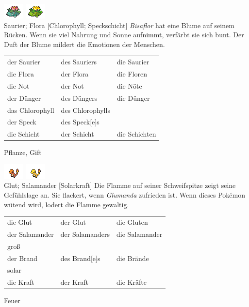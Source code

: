 \documentclass[a7paper,10pt,grid=both
,toc
]{kartei}
\begin{document}
\begin{karte}[Notdünger]{
\includegraphics{../regular/venusaur}
\includegraphics{../shiny/venusaur} \\
Saurier; Flora
}[Chlorophyll; Speckschicht]
\emph{Bisaflor} hat eine Blume auf seinem Rücken. Wenn sie viel Nahrung und
Sonne aufnimmt, verfärbt sie sich bunt. Der Duft der Blume mildert die Emotionen
der Menschen.

\vspace{5pt}
\begin{tabular}{lll}
der Saurier & des Sauriers & die Saurier \\
die Flora & der Flora & die Floren \\
die Not & der Not & die Nöte \\
der Dünger & des Düngers & die Dünger \\
das Chlorophyll & des Chlorophylls & \\
der Speck & des Speck[e]s & \\
die Schicht & der Schicht & die Schichten \\
\end{tabular}
\vspace{5pt}

Pflanze, Gift
\end{karte}


\begin{karte}[Großbrand]{
\includegraphics{../regular/charmander}
\includegraphics{../shiny/charmander} \\
Glut; Salamander
}[Solarkraft]
Die Flamme auf seiner Schweifspitze zeigt seine Gefühlslage an. Sie flackert,
wenn \emph{Glumanda} zufrieden ist. Wenn dieses Pokémon wütend wird, lodert die
Flamme gewaltig.

\vspace{5pt}
\begin{tabular}{lll}
die Glut	&	der Glut	&	die Gluten \\
der Salamander	&	der Salamanders	&	die Salamander \\
groß \\
der Brand	&	des Brand[e]s	&	die Brände \\
solar \\
die Kraft	&	der Kraft	&	die Kräfte \\
\end{tabular}
\vspace{5pt}

Feuer
\end{karte}
\end{document}
